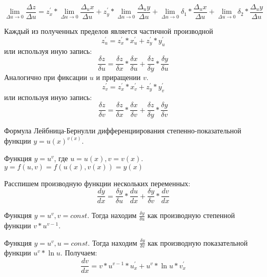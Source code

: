     \begin{equation*}
        \lim_{\Delta{u}\to 0}\frac{\Delta{z}}{\Delta{u}} = z_{x}^{'} * \lim_{\Delta{u}\to 0}\frac{\Delta_{u}x}{\Delta{u}} + z_{y}^{'} * \lim_{\Delta{u}\to 0}\frac{\Delta_{u}y}{\Delta{u}} + \lim_{\Delta{u}\to 0}\delta_{1} * \frac{\Delta_{u}x}{\Delta{u}} + \lim_{\Delta{u}\to 0}\delta_{2} * \frac{\Delta_{u}y}{\Delta{u}}
    \end{equation*}
    
    Каждый из полученных пределов является частичной производной
    \begin{equation}
        z_{u}^{'} = z_{x}^{'} * x_{u}^{'} + z_{y}^{'} * y_{u}^{'}
    \end{equation}
    или используя иную запись:
    \begin{equation*}
        \frac{\delta{z}}{\delta{u}} = \frac{\delta{z}}{\delta{x}} * \frac{\delta{x}}{\delta{u}} + \frac{\delta{z}}{\delta{y}} * \frac{\delta{y}}{\delta{u}} 
    \end{equation*}
    Аналогично при фиксации $u$ и приращении $v$.
    \begin{equation*}
        z_{v}^{'} = z_{x}^{'} * x_{v}^{'} + z_{y}^{'} * y_{v}^{'}
    \end{equation*}
    или используя иную запись:
    \begin{equation*}
        \frac{\delta{z}}{\delta{v}} = \frac{\delta{z}}{\delta{x}} * \frac{\delta{x}}{\delta{v}} + \frac{\delta{z}}{\delta{y}} * \frac{\delta{y}}{\delta{v}} 
    \end{equation*}
    
\begin{definition}[\rom{1}]
     Формула Лейбница-Бернулли дифференциирования степенно-показательной функции $y=u(x)^{v(x)}$.
\end{definition}

    Функция $y=u^{v}$, где $u=u(x), v=v(x)$.
    $y=f(u,v)=f(u(x),v(x))=y(x)$
    
    Расспишем производную функции нескольких переменных:
    \begin{equation}
        \frac{dy}{dx} = \frac{\delta{y}}{\delta{u}} * \frac{du}{dx} + \frac{\delta{y}}{\delta{v}} * \frac{dv}{dx}
    \end{equation}
    
    Функция $y=u^{v}, v=const$. Тогда находим $\frac{\delta{y}}{\delta{u}}$ как производную степенной функции $v*u^{v-1}$.
    
    Функция $y=u^{v}, u=const$. Тогда находим $\frac{\delta{y}}{\delta{v}}$ как производную показательной функции $u^{v}*\ln{u}$.
    Получаем:
    \begin{equation}
       \frac{dv}{dx} = v*u^{v-1} * u_{x}^{'} + u^{v}*\ln{u} * v_{x}^{'}
    \end{equation}
